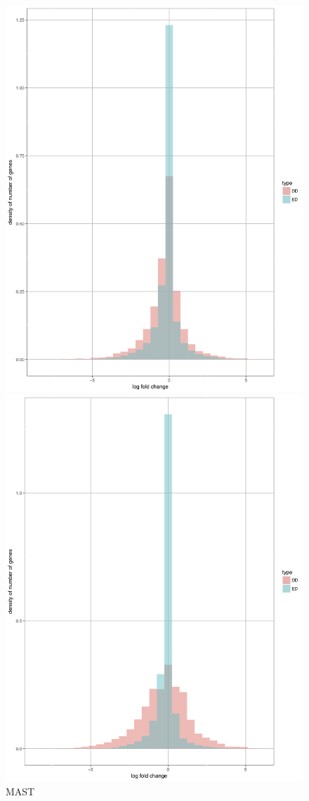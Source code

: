 \documentclass[11pt]{amsart}
\begin{document}
\begin{figure}[H]
  \includegraphics[width=\linewidth]{G45719_mast.png}
  \caption{MAST}
\endminipage\hfill
{}
  \includegraphics[width=\linewidth]{G45719_scdd.png}

\end{figure}
\end{document}
